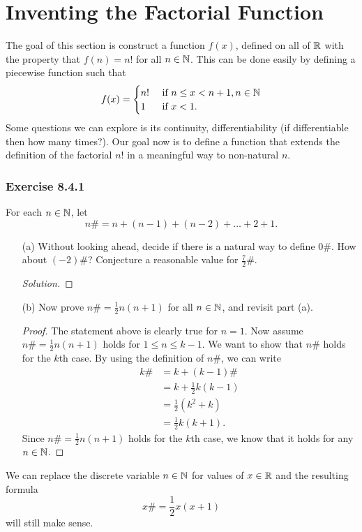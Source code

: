 \section{Inventing the Factorial Function}
The goal of this section is construct a function \( f(x)  \), defined on all of \( \mathbb{R}  \) with the property that \( f(n) = n!  \) for all \( n \in \mathbb{N}  \). This can be done easily by defining a piecewise function such that  
\[ f(x) = 
\begin{cases}
    n! \ &\text{if } n \leq x < n+1, n \in \mathbb{N} \\ 
    1 \ &\text{if } x < 1.
\end{cases}  \] Some questions we can explore is its continuity, differentiability (if differentiable then how many times?). Our goal now is to define a function that extends the definition of the factorial \( n!  \) in a meaningful way to non-natural \(  n \). 
\subsubsection{Exercise 8.4.1} For each \( n \in \mathbb{N}  \), let 
\[  n \# = n + (n -1 ) + (n-2) + \dots + 2 + 1. \]
\begin{enumerate}
    \item[(a)] Without looking ahead, decide if there is a natural way to define \( 0 \#  \). How about \( (-2) \#  \)? Conjecture a reasonable value for \(  \frac{ 7 }{ 2 }  \# \).
        \begin{proof}[Solution]
        
        \end{proof}
    \item[(b)] Now prove \( n \# = \frac{ 1 }{ 2 }  n (n+1) \) for all \( n \in \mathbb{N}  \), and revisit part (a).
        \begin{proof}
        The statement above is clearly true for \( n =1  \). Now assume \(  n \#   = \frac{ 1 }{ 2 }  n (n+1) \) holds for \(  1 \leq n \leq k -1  \). We want to show that \( n \#  \) holds for the \( k  \)th case. By using the definition of \( n \#  \), we can write 
        \begin{align*}
            k \# &= k + (k-1)\#  \\
                 &= k + \frac{ 1 }{ 2 }  k (k-1) \\
                 &= \frac{ 1 }{ 2 }  (k^{2} + k) \\
                 &= \frac{ 1 }{ 2 } k (k+1).
        \end{align*}
        Since \( n \# = \frac{ 1 }{ 2 }  n (n+1)  \) holds for the \( k  \)th case, we know that it holds for any \( n \in \mathbb{N}  \).
        \end{proof}
\end{enumerate}
We can replace the discrete variable \( n \in \mathbb{N}   \) for values of \( x \in \mathbb{R}  \) and the resulting formula 
\[  x \# = \frac{ 1 }{ 2 }  x (x+1)  \] will still make sense.


